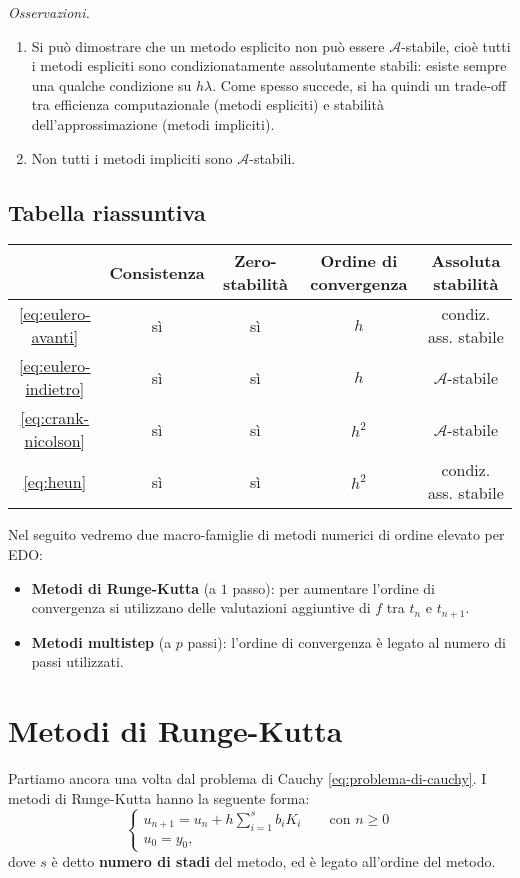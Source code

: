 \textit{Osservazioni.}
\begin{enumerate}
\item Si può dimostrare che un metodo esplicito non può essere $\mathcal{A}$-stabile, cioè tutti i metodi espliciti sono condizionatamente assolutamente stabili: esiste sempre una qualche condizione su $h\lambda $.
Come spesso succede, si ha quindi un trade-off tra efficienza computazionale (metodi espliciti) e stabilità dell'approssimazione (metodi impliciti).
\item Non tutti i metodi impliciti sono $\mathcal{A}$-stabili.
\end{enumerate}

\subsection{Tabella riassuntiva}
\begin{center}

\begin{tabular}{ccccc}
\toprule
  & Consistenza & Zero-stabilità & Ordine di convergenza & Assoluta stabilità \\
\midrule
\eqref{eq:eulero-avanti} & sì & sì & $h$ & condiz. ass. stabile \\
\eqref{eq:eulero-indietro} & sì & sì & $h$ & $\mathcal{A}$-stabile \\
\eqref{eq:crank-nicolson} & sì & sì & $h^{2}$ & $\mathcal{A}$-stabile \\
\eqref{eq:heun} & sì & sì & $h^{2}$ & condiz. ass. stabile \\
 \bottomrule
\end{tabular}
\end{center}
Nel seguito vedremo due macro-famiglie di metodi numerici di ordine elevato per EDO:
\begin{itemize}
\item \textbf{Metodi di Runge-Kutta} (a $1$ passo): per aumentare l'ordine di convergenza si utilizzano delle valutazioni aggiuntive di $f$ tra $t_{n}$ e $t_{n+1}$.
\item \textbf{Metodi multistep} (a $p$ passi): l'ordine di convergenza è legato al numero di passi utilizzati.
\end{itemize}
\section{Metodi di Runge-Kutta}

Partiamo ancora una volta dal problema di Cauchy \eqref{eq:problema-di-cauchy}.
I metodi di Runge-Kutta hanno la seguente forma:
\begin{equation}
\begin{cases}
u_{n+1} =u_{n} +h\sum\limits ^{s}_{i=1} b_{i} K_{i} \qquad \text{con } n\geqslant 0\\
u_{0} =y_{0},
\end{cases}
\end{equation}
dove $s$ è detto \textbf{numero di stadi} del metodo, ed è legato all'ordine del metodo.

